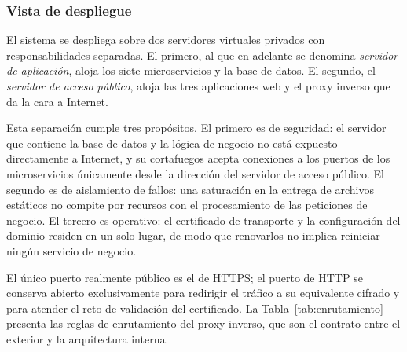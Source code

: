 	\subsubsection{Vista de despliegue}
	El sistema se despliega sobre dos servidores virtuales privados con responsabilidades separadas.
	El primero, al que en adelante se denomina \emph{servidor de aplicación}, aloja los siete
	microservicios y la base de datos. El segundo, el \emph{servidor de acceso público}, aloja las
	tres aplicaciones web y el proxy inverso que da la cara a Internet.
	
	Esta separación cumple tres propósitos. El primero es de seguridad: el servidor que contiene la
	base de datos y la lógica de negocio no está expuesto directamente a Internet, y su cortafuegos
	acepta conexiones a los puertos de los microservicios únicamente desde la dirección del servidor
	de acceso público. El segundo es de aislamiento de fallos: una saturación en la entrega de
	archivos estáticos no compite por recursos con el procesamiento de las peticiones de negocio.
	El tercero es operativo: el certificado de transporte y la configuración del dominio residen en
	un solo lugar, de modo que renovarlos no implica reiniciar ningún servicio de negocio.
	
	El único puerto realmente público es el de HTTPS; el puerto de HTTP se conserva abierto
	exclusivamente para redirigir el tráfico a su equivalente cifrado y para atender el reto de
	validación del certificado. La Tabla~\ref{tab:enrutamiento} presenta las reglas de enrutamiento
	del proxy inverso, que son el contrato entre el exterior y la arquitectura interna.
	
	\small
	\renewcommand{\arraystretch}{1.2}
	
